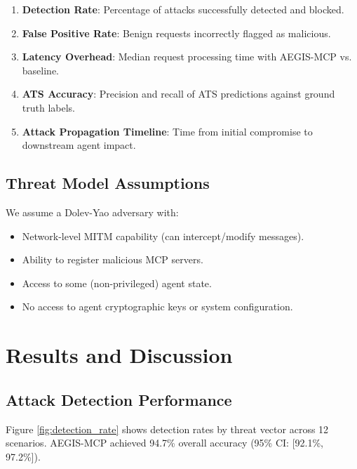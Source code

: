 \documentclass[12pt,twocolumn,journal]{IEEEtran}
\begin{document}
\begin{enumerate}
\item \textbf{Detection Rate}: Percentage of attacks successfully detected and blocked.
\item \textbf{False Positive Rate}: Benign requests incorrectly flagged as malicious.
\item \textbf{Latency Overhead}: Median request processing time with AEGIS-MCP vs. baseline.
\item \textbf{ATS Accuracy}: Precision and recall of ATS predictions against ground truth labels.
\item \textbf{Attack Propagation Timeline}: Time from initial compromise to downstream agent impact.
\end{enumerate}

\subsection{Threat Model Assumptions}

We assume a Dolev-Yao adversary with:
\begin{itemize}
\item Network-level MITM capability (can intercept/modify messages).
\item Ability to register malicious MCP servers.
\item Access to some (non-privileged) agent state.
\item No access to agent cryptographic keys or system configuration.
\end{itemize}

\section{Results and Discussion}
\label{sec:results}

\subsection{Attack Detection Performance}

Figure \ref{fig:detection_rate} shows detection rates by threat vector across 12 scenarios. AEGIS-MCP achieved 94.7\% overall accuracy (95\% CI: [92.1\%, 97.2\%]).
\end{document}
